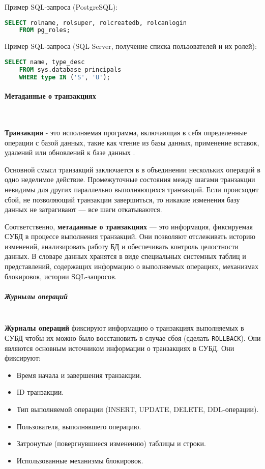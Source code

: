 \begin{enumerate}
    Пример SQL-запроса (PostgreSQL):
    \begin{lstlisting}[language=SQL]
    SELECT rolname, rolsuper, rolcreatedb, rolcanlogin 
    FROM pg_roles;             
    \end{lstlisting}

    Пример SQL-запроса (SQL Server, получение списка пользователей и их ролей):
    \begin{lstlisting}[language=SQL]
    SELECT name, type_desc 
    FROM sys.database_principals 
    WHERE type IN ('S', 'U');              
    \end{lstlisting}

\end{enumerate}

\paragraph{Метаданные о транзакциях} ~\\

\begin{grayquote}
    \textbf{Транзакция} - это исполняемая программа, включающая в себя определенные операции с базой данных, такие как чтение из базы данных, применение вставок, удалений или обновлений к базе данных \autocite{ElmasriNavathe}.
\end{grayquote}

Основной смысл транзакций заключается в в объединении нескольких операций в одно неделимое действие. Промежуточные состояния между шагами транзакции невидимы для других параллельно выполняющихся транзакций. Если происходит сбой, не позволяющий транзакции завершиться, то никакие изменения базу данных не затрагивают — все шаги откатываются. \autocite{PostgreSQLdocc3p4}

Соответственно, \textbf{метаданные о транзакциях} — это информация, фиксируемая СУБД в процессе выполнения транзакций. Они позволяют отслеживать историю изменений, анализировать работу БД и обеспечивать контроль целостности данных. В словаре данных хранятся в виде специальных системных таблиц и представлений, содержащих информацию о выполняемых операциях, механизмах блокировок, истории SQL-запросов.

\subparagraph{Журнылы операций} ~\\

\textbf{Журналы операций} фиксируют информацию о транзакциях выполняемых в СУБД чтобы их можно было восстановить в случае сбоя (сделать \texttt{ROLLBACK}). Они являются основным источником информации о транзакциях в СУБД. Они фиксируют:
\begin{itemize}
    \item Время начала и завершения транзакции.
    \item ID транзакции.
    \item Тип выполняемой операции (INSERT, UPDATE, DELETE, DDL-операции).
    \item Пользователя, выполнявшего операцию.
    \item Затронутые (повергнувшиеся изменению) таблицы и строки.
    \item Использованные механизмы блокировок.
\end{itemize}


